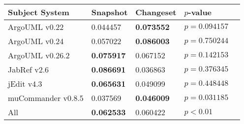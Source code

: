 \begin{table}[t]
\begin{tabular}{l|ll|ll}
\toprule
Subject System & Snapshot & Changeset & $p$-value  \\
\midrule
ArgoUML v0.22 & 0.044457 & {\bf 0.073552 } & $p = 0.094157$ \\
ArgoUML v0.24 & 0.057022 & {\bf 0.086003 } & $p = 0.750244$ \\
ArgoUML v0.26.2 & {\bf 0.075917 } & 0.067152 & $p = 0.142153$ \\
JabRef v2.6 & {\bf 0.086691 } & 0.036863 & $p = 0.376345$ \\
jEdit v4.3 & {\bf 0.065631 } & 0.049099 & $p = 0.448448$ \\
muCommander v0.8.5 & 0.037569 & {\bf 0.046009 } & $p = 0.031185$ \\
\midrule
All & {\bf 0.062533 } & 0.060422 & $p < 0.01$ \\
\bottomrule
\end{tabular}
\label{table:rq1:method:lda}
\end{table}
